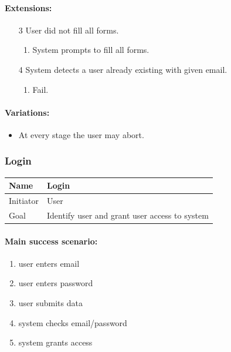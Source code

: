 \documentclass[a4paper]{scrartcl}
\begin{document}
\paragraph{Extensions:}
\begin{enumerate}
	\item[3] User did not fill all forms.
		\begin{enumerate}
			\item System prompts to fill all forms.
		\end{enumerate}
	\item[4] System detects a user already existing with given email.
		\begin{enumerate}
			\item Fail.
		\end{enumerate}
\end{enumerate}


\paragraph{Variations:}
\begin{itemize}
	\item At every stage the user may abort.
\end{itemize}

\subsubsection{Login}

\begin{tabular}{|g|l|}
	\hline Name      & Login                                         \\ 
	\hline Initiator & User                                          \\ 
	\hline Goal      & Identify user and grant user access to system \\ 
	\hline
\end{tabular}

\paragraph{Main success scenario:}
\begin{enumerate}
	\item user enters email
	\item user enters password
	\item user submits data
	\item system checks email/password
	\item system grants access
\end{enumerate}
\end{document}

